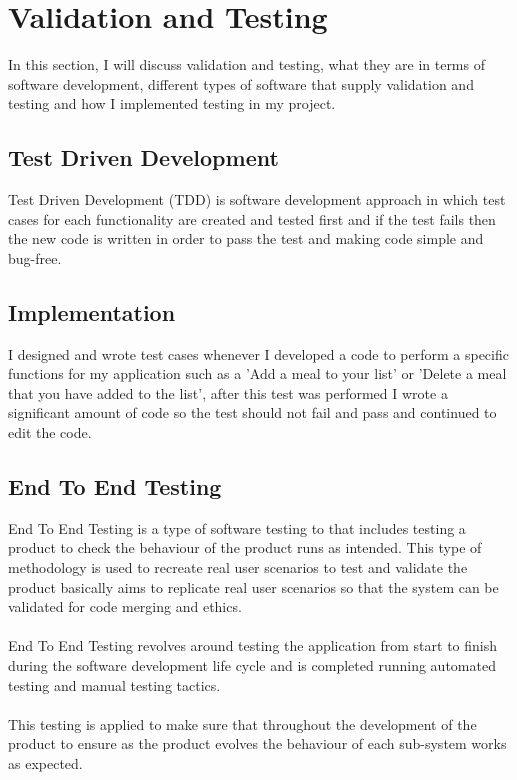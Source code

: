 \section{Validation and Testing}

In this section, I will discuss validation and testing, what they are in terms of software development, different types of software that supply validation and testing and how I implemented testing in my project.

\subsection{Test Driven Development}

Test Driven Development (TDD) is software development approach in which test cases for each functionality are created and tested first and if the test fails then the new code is written in order to pass the test and making code simple and bug-free.

\subsection{Implementation}

I designed and wrote test cases whenever I developed a code to perform a specific functions for my application such as a 'Add a meal to your list' or 'Delete a meal that you have added to the list', after this test was performed I wrote a significant amount of code so the test should not fail and pass and continued to edit the code.

\subsection{End To End Testing}

End To End Testing is a type of software testing to that includes testing a product to check the behaviour of the product runs as intended. This type of methodology is used to recreate real user scenarios to test and validate the product basically aims to replicate real user scenarios so that the system can be validated for code merging and ethics.\\ \\
End To End Testing revolves around testing the application from start to finish during the software development life cycle and is completed running automated testing and manual testing tactics.\\ \\
This testing is applied to make sure that throughout the development of the product to ensure as the product evolves the behaviour of each sub-system works as expected.

